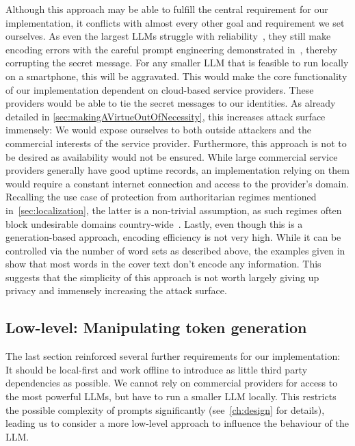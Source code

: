 Although this approach may be able to fulfill the central requirement for our implementation, it conflicts with almost every other goal and requirement we set ourselves. As even the largest \glspl{LLM} struggle with reliability~\cite{vendrowLargeLanguageModel2025}, they still make encoding errors with the careful prompt engineering demonstrated in~\cite{steinebachNaturalLanguageSteganography2024,wuPromptingSteganographyNew2024}, thereby corrupting the secret message. For any smaller \gls{LLM} that is feasible to run locally on a smartphone, this will be aggravated. This would make the core functionality of our implementation dependent on cloud-based service providers. These providers would be able to tie the secret messages to our identities. As already detailed in \cref{sec:makingAVirtueOutOfNecessity}, this increases attack surface immensely: We would expose ourselves to both outside attackers and the commercial interests of the service provider. Furthermore, this approach is not to be desired as availability would not be ensured. While large commercial service providers generally have good uptime records, an implementation relying on them would require a constant internet connection and access to the provider's domain. Recalling the use case of protection from authoritarian regimes mentioned in~\cref{sec:localization}, the latter is a non-trivial assumption, as such regimes often block undesirable domains country-wide~\cite{wongSocialMediaMay2016,michaelsonJournalistsMore11002025}. Lastly, even though this is a generation-based approach, encoding efficiency is not very high. While it can be controlled via the number of word sets as described above, the examples given in~\cite{steinebachNaturalLanguageSteganography2024} show that most words in the cover text don't encode any information. This suggests that the simplicity of this approach is not worth largely giving up privacy and immensely increasing the attack surface.

\subsection{Low-level: Manipulating token generation}
\label{sec:lowLevelManipulatingTokenGeneration}
The last section reinforced several further requirements for our implementation: It should be local-first and work offline to introduce as little third party dependencies as possible. We cannot rely on commercial providers for access to the most powerful \glspl{LLM}, but have to run a smaller \gls{LLM} locally. This restricts the possible complexity of prompts significantly (see~\cref{ch:design} for details), leading us to consider a more low-level approach to influence the behaviour of the \gls{LLM}.

